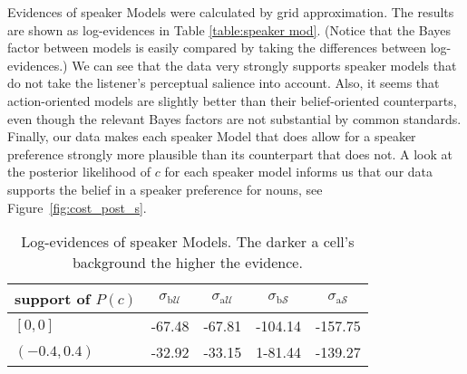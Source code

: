 Evidences of speaker Models were calculated by grid approximation. The
results are shown as log-evidences in Table \ref{table:speaker
  mod}. (Notice that the Bayes factor between models is easily
compared by taking the differences between log-evidences.) We can see
that the data very strongly supports speaker models that do not take
the listener's perceptual salience into account. Also, it seems that
action-oriented models are slightly better than their belief-oriented
counterparts, even though the relevant Bayes factors are not
substantial by common standards. Finally, our data makes each speaker
Model that does allow for a speaker preference strongly more plausible
than its counterpart that does not. A look at the posterior likelihood
of $c$ for each speaker model informs us that our data supports the
belief in a speaker preference for nouns, see
Figure~\ref{fig:cost_post_s}.
%
\begin{table}[htb] 
  \centering 
  \caption{Log-evidences of speaker Models. The darker a cell's
    background the higher the evidence.}
  \begin{tabular}{lcccc}
    support of $P(c)$ 
    & $\sigma_{\mathrm{b}\mathcal{U}}$
    & $\sigma_{\mathrm{a}\mathcal{U}}$
    & $\sigma_{\mathrm{b}\mathcal{S}}$
    & $\sigma_{\mathrm{a}\mathcal{S}}$
    \\ \midrule
    $[0,0]$
    & \cellcolor{lightgray!72} -67.48 
    & \cellcolor{lightgray!72}  -67.81 
    & \cellcolor{lightgray!43} -104.14 
    & \cellcolor{lightgray!0} -157.75
    \\
    $(-0.4,0.4)$
    & \cellcolor{lightgray!100} -32.92 
    & \cellcolor{lightgray!99} -33.15  
    & \cellcolor{lightgray!61} \textcolor{lightgray!61}{1}-81.44 
    & \cellcolor{lightgray!15} -139.27
  \end{tabular} 
  \label{table:speaker mod}
\end{table}
%
